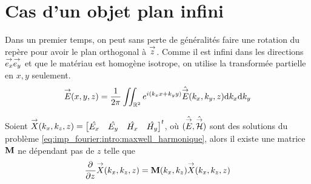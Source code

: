 \section{Cas d'un objet plan infini}

    \begin{figure}[!h]
        \begin{center}
            \begin{tikzpicture}
                
            \end{tikzpicture}
        \end{center}
    \end{figure}

    Dans un premier temps, on peut sans perte de généralités faire une rotation du repère pour avoir le plan orthogonal à \(\vect{z}\). Comme il est infini dans les directions \(\vect{e_x} \vect{e_y}\) et que le matériau est homogène isotrope, on utilise la transformée partielle en \(x, y\) seulement.
    \begin{equation}
        \vE(x,y,z) = \frac{1}{2\pi}\iint_{\RR^2} e^{i(k_x x + k_y y)}\hat{\vE} (k_x,k_y,z) \dd{k_x}\dd{k_y}
    \end{equation}

    \begin{prop}
        Soient \(\vect{X}(k_x,k_z,z) =
        \begin{bmatrix}
        \hat{E_x} &
        \hat{E_y} &
        \hat{H_x} &
        \hat{H_y}
        \end{bmatrix}^t\),
        où \((\hat \vE,\hat \vH)\) sont des solutions du problème \eqref{eq:imp_fourier:intro:maxwell_harmonique}, alors il existe une matrice \(\mat{M}\) ne dépendant pas de \(z\) telle que
        \begin{equation}
            \ddr{z}{}\vect{X}(k_x,k_z,z) = \mat{M}(k_x,k_z) \vect{X}(k_x,k_z,z)
            \label{eq:imp_fourier:plan:edo}
        \end{equation}
    \end{prop}

